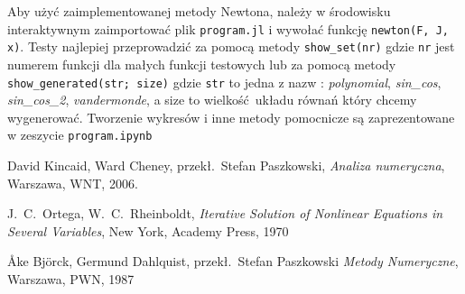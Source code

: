 \documentclass[11pt,wide]{mwart}
\begin{document}
Aby użyć zaimplementowanej metody Newtona, należy w środowisku interaktywnym zaimportować plik \texttt{program.jl} i wywołać funkcję \texttt{newton(F, J, x)}. Testy najlepiej przeprowadzić za pomocą metody \texttt{show\_set(nr)} gdzie \texttt{nr} jest numerem funkcji dla małych funkcji testowych lub za pomocą metody \texttt{show\_generated(str; size)} gdzie \texttt{str} to jedna z nazw : \emph{polynomial}, \emph{sin\_cos}, \emph{sin\_cos\_2}, \emph{vandermonde}, a size to wielkość układu równań który chcemy wygenerować. Tworzenie wykresów i inne metody pomocnicze są zaprezentowane w zeszycie \texttt{program.ipynb}

\begin{thebibliography}{99}

 David Kincaid, Ward Cheney, przekł.~Stefan Paszkowski,
\emph{Analiza numeryczna},
Warszawa, WNT, 2006.

 J.~C.~Ortega, W.~C.~Rheinboldt,
\emph{Iterative Solution of Nonlinear Equations in Several Variables},
New York, Academy Press, 1970

 \r{A}ke Bj\"{o}rck, Germund Dahlquist, przekł.~Stefan Paszkowski
\emph{Metody Numeryczne},
Warszawa, PWN, 1987

\end{thebibliography}
\end{document}
